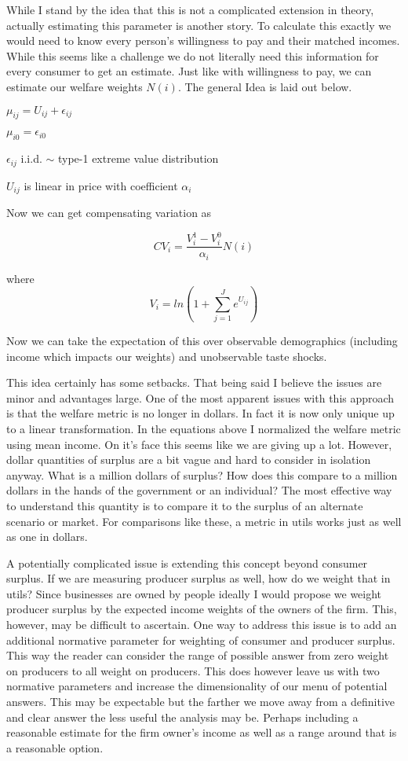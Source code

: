 \documentclass[11pt]{article}
\begin{document}
While I stand by the idea that this is not a complicated extension in theory, actually estimating this parameter is another story. To calculate this exactly we would need to know every person's willingness to pay and their matched incomes. While this seems like a challenge we do not literally need this information for every consumer to get an estimate. Just like with willingness to pay, we can estimate our welfare weights $N(i)$. The general Idea is laid out below. 

$\mu_{ij} = U_{ij} + \epsilon_{ij}$

 $\mu_{i0} = \epsilon_{i0}$
 
 $\epsilon_{ij}$ i.i.d. $\sim$ type-1 extreme value distribution 
 
 $U_{ij}$ is linear in price with coefficient $\alpha_i$
 

Now we can get compensating variation as 

$$ CV_i = \frac{V_i^1 - V_i^0}{\alpha_i} N(i) $$ 

where 
$$ V_i = ln(1 + \sum_{j = 1}^{J} e^{U_{ij}})$$ 

Now we can take the expectation of this over observable demographics (including income which impacts our weights) and unobservable taste shocks. 


This idea certainly has some setbacks. That being said I believe the issues are minor and advantages large. One of the most apparent issues with this approach is that the welfare metric is no longer in dollars. In fact it is now only unique up to a linear transformation. In the equations above I normalized the welfare metric using mean income. On it's face this seems like we are giving up a lot. However, dollar quantities of surplus are a bit vague and hard to consider in isolation anyway. What is a million dollars of surplus? How does this compare to a million dollars in the hands of the government or an individual? The most effective way to understand this quantity is to compare it to the surplus of an alternate scenario or market. For comparisons like these, a metric in utils works just as well as one in dollars. 

A potentially complicated issue is extending this concept beyond consumer surplus. If we are measuring producer surplus as well, how do we weight that in utils? Since businesses are owned by people ideally I would propose we weight producer surplus by the expected income weights of the owners of the firm. This, however, may be difficult to ascertain. One way to address this issue is to add an additional normative parameter for weighting of consumer and producer surplus. This way the reader can consider the range of possible answer from zero weight on producers to all weight on producers. This does however leave us with two normative parameters and increase the dimensionality of our menu of potential answers. This may be expectable but the farther we move away from a definitive and clear answer the less useful the analysis may be. Perhaps including a reasonable estimate for the firm owner's income as well as a range around that is a reasonable option. 
\end{document}
